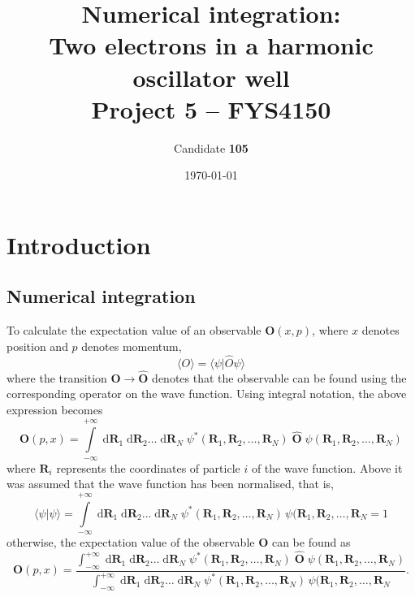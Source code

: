 \documentclass[a4paper,11pt]{article}
\date{\today}
\title{Numerical integration:\\ Two electrons in a harmonic oscillator well\\ \small{Project 5 -- FYS4150}}
\author{Candidate \textbf{105}}
\newcommand{\diff}{\ensuremath{\; \text{d}}}
\begin{document}
\onecolumn
\maketitle{}

\begin{abstract}
\end{abstract}

\section{Introduction}

\subsection{Numerical integration}
To calculate the expectation value of an observable $\mathbf{O}(x,p)$, where $x$ denotes position and $p$ denotes momentum,
\begin{equation}
    \langle O \rangle   =   \langle \psi | \hat{O} \psi \rangle
    \label{eq:observable}
\end{equation}
where the transition $\mathbf{O} \to \hat{\mathbf{O}}$ denotes that the observable can be found using the corresponding operator on the wave function. Using integral notation, the above expression becomes
\begin{equation}
    \mathbf{O}(p,x)   =   \int\limits_{-\infty}^{+\infty} \diff \mathbf{R}_1 \diff \mathbf{R}_2 \dots \diff \mathbf{R}_N \; \psi^*(\mathbf{R}_1, \mathbf{R}_2, \dots, \mathbf{R}_N ) \; \hat{\mathbf{O}} \; \psi(\mathbf{R}_1, \mathbf{R}_2, \dots, \mathbf{R}_N )
    \label{eq:observable_int1}
\end{equation}
where $\mathbf{R}_i$ represents the coordinates of particle $i$ of the wave function. Above it was assumed that the wave function has been normalised, that is,
\[ \langle \psi | \psi \rangle = \int\limits_{-\infty}^{+\infty}\! \diff \mathbf{R}_1 \diff \mathbf{R}_2 \dots \diff \mathbf{R}_N \; \psi^*(\mathbf{R}_1, \mathbf{R}_2, \dots, \mathbf{R}_N ) \, \psi(\mathbf{R}_1, \mathbf{R}_2, \dots, \mathbf{R}_N = 1 \]
otherwise, the expectation value of the observable $\mathbf{O}$ can be found as
\begin{equation}
    \mathbf{O}(p,x)   =   \frac{\int_{-\infty}^{+\infty} \diff \mathbf{R}_1 \diff \mathbf{R}_2 \dots \diff \mathbf{R}_N \; \psi^*(\mathbf{R}_1, \mathbf{R}_2, \dots, \mathbf{R}_N ) \; \hat{\mathbf{O}} \; \psi(\mathbf{R}_1, \mathbf{R}_2, \dots, \mathbf{R}_N ) }{ \int_{-\infty}^{+\infty} \diff \mathbf{R}_1 \diff \mathbf{R}_2 \dots \diff \mathbf{R}_N \; \psi^*(\mathbf{R}_1, \mathbf{R}_2, \dots, \mathbf{R}_N ) \, \psi(\mathbf{R}_1, \mathbf{R}_2, \dots, \mathbf{R}_N }.
    \label{eq:observable_final}
\end{equation}
\end{document}
